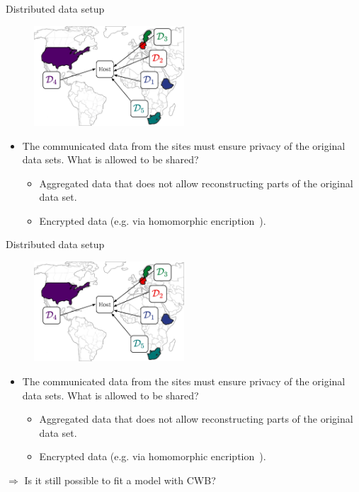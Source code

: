 \documentclass[t,10pt]{beamer}
\begin{document}
\begin{frame}{Distributed data setup}
  \begin{figure}
    \centering
    \includegraphics[width=0.5\textwidth]{figures/fig-sites-host2.png}
  \end{figure}
  \begin{itemize}
    \item The communicated data from the sites must ensure privacy of the original data sets.
  What is allowed to be shared?
  \begin{itemize}
    \item Aggregated data that does not allow reconstructing parts of the original data set.
    \item Encrypted data (e.g. via homomorphic encription~\citep{gentry2009fully}).
  \end{itemize}
  \end{itemize}
  \addtocounter{framenumber}{-1}
\end{frame}

\begin{frame}{Distributed data setup}
  \begin{figure}
    \centering
    \includegraphics[width=0.5\textwidth]{figures/fig-sites-host2.png}
  \end{figure}
  \begin{itemize}
    \item The communicated data from the sites must ensure privacy of the original data sets.
  What is allowed to be shared?
  \begin{itemize}
    \item Aggregated data that does not allow reconstructing parts of the original data set.
    \item Encrypted data (e.g. via homomorphic encription~\citep{gentry2009fully}).
  \end{itemize}
  \end{itemize}
  $\Rightarrow$ Is it still possible to fit a model with CWB?
  \addtocounter{framenumber}{-1}
\end{frame}
\end{document}
